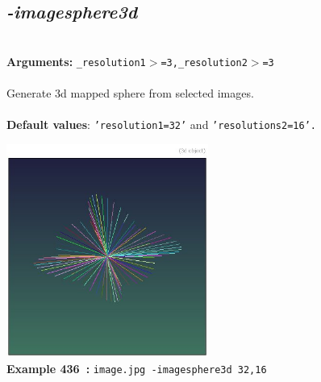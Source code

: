 \documentclass[a4paper,11pt,twoside]{book}
\begin{document}
\subsection{\emph{-imagesphere3d} }\vspace*{-0.5em}
~\\\textbf{Arguments: } 
{\small \texttt{\_resolution1$>$=3,\_resolution2$>$=3}}\\~\\
Generate 3d mapped sphere from selected images.
~\\~\\\textbf{Default values}: {\small \texttt{'resolution1=32'} and \texttt{'resolutions2=16'.}}
\begin{center}\includegraphics[keepaspectratio=true,height=7cm,width=\textwidth]{img/gmic_def436.jpg}\\
{\footnotesize \textbf{Example 436~:} \texttt{image.jpg -imagesphere3d 32,16}}
\end{center}
\end{document}

